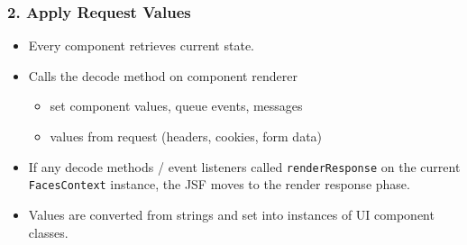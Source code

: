 \documentclass[10pt,xcolor=pdflatex]{beamer}
\begin{document}
\begin{frame}\frametitle{2. Apply Request Values}
	\begin{itemize}
		\item Every component retrieves current state.
		\item Calls the decode method on component renderer
          \begin{itemize}
        	\item set component values, queue events, messages
            \item values from request (headers, cookies, form data)
          \end{itemize}
        \item If any decode methods / event listeners called \texttt{renderResponse} on the current \texttt{FacesContext} instance, the JSF moves to the render response phase.
        \medskip
        \item Values are converted from strings and set into instances of UI component classes.
	\end{itemize}
\end{frame}
\end{document}
